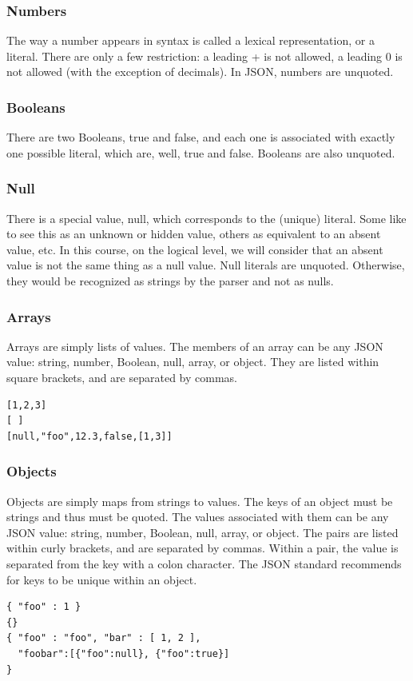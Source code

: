 \subsubsection{Numbers}
The way a number appears in syntax is called a lexical representation, or a literal. There are only a few restriction: a leading + is not allowed, a leading 0 is not allowed (with the exception of decimals). In JSON, numbers are unquoted.

\subsubsection{Booleans}
There are two Booleans, true and false, and each one is associated with exactly one possible literal, which are, well, true and false. Booleans are also unquoted.

\subsubsection{Null}
There is a special value, null, which corresponds to the (unique) literal. Some like to see this as an unknown or hidden value, others as equivalent to an absent value, etc. In this course, on the logical level, we will consider that an absent value is not the same thing as a null value.
Null literals are unquoted. Otherwise, they would be recognized as strings by the parser and not as nulls.

\subsubsection{Arrays}
Arrays are simply lists of values. The members of an array can be any JSON value: string, number, Boolean, null, array, or object. They are listed within square brackets, and are separated by commas.
\begin{lstlisting}[style=json, caption={Examples of Arrays}, label={lst:json2}]
[1,2,3]
[ ]
[null,"foo",12.3,false,[1,3]]
\end{lstlisting}

\subsubsection{Objects}
Objects are simply maps from strings to values. The keys of an object must be strings and thus must be quoted. The values associated with them can be any JSON value: string, number, Boolean, null, array, or object. The pairs are listed within curly brackets, and are separated by commas. Within a pair, the value is separated from the key with a colon character. The JSON standard recommends for keys to be unique within an object.
\begin{lstlisting}[style=json, caption={Examples of Objects}, label={lst:json2}]
{ "foo" : 1 }
{}
{ "foo" : "foo", "bar" : [ 1, 2 ],
  "foobar":[{"foo":null}, {"foo":true}]
}   
\end{lstlisting}


